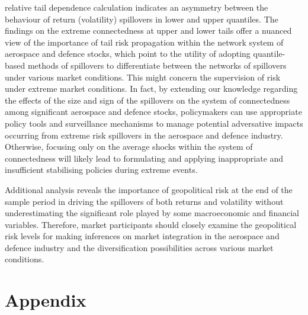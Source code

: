 \documentclass[
  letterpaper,
  DIV=11,
  numbers=noendperiod]{scrartcl}
\begin{document}
relative tail dependence calculation indicates an asymmetry between the
behaviour of return (volatility) spillovers in lower and upper
quantiles. The findings on the extreme connectedness at upper and lower
tails offer a nuanced view of the importance of tail risk propagation
within the network system of aerospace and defence stocks, which point
to the utility of adopting quantile-based methods of spillovers to
differentiate between the networks of spillovers under various market
conditions. This might concern the supervision of risk under extreme
market conditions. In fact, by extending our knowledge regarding the
effects of the size and sign of the spillovers on the system of
connectedness among significant aerospace and defence stocks,
policymakers can use appropriate policy tools and surveillance
mechanisms to manage potential adversative impacts occurring from
extreme risk spillovers in the aerospace and defence industry.
Otherwise, focusing only on the average shocks within the system of
connectedness will likely lead to formulating and applying inappropriate
and insufficient stabilising policies during extreme events.

Additional analysis reveals the importance of geopolitical risk at the
end of the sample period in driving the spillovers of both returns and
volatility without underestimating the significant role played by some
macroeconomic and financial variables. Therefore, market participants
should closely examine the geopolitical risk levels for making
inferences on market integration in the aerospace and defence industry
and the diversification possibilities across various market conditions.

\hypertarget{appendix}{%
\section{Appendix}\label{appendix}}
\end{document}
